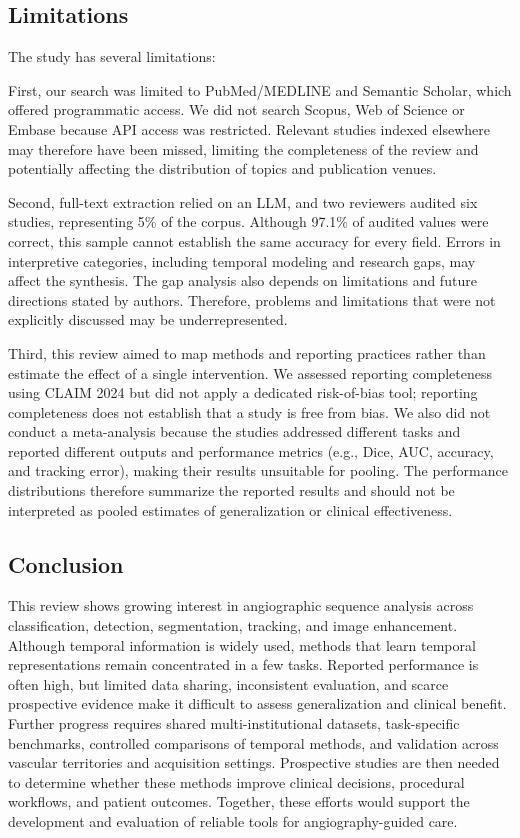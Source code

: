 \subsection{Limitations}
\label{sec:limitations}
The study has several limitations:

First, our search was limited to PubMed/\allowbreak MEDLINE and Semantic Scholar, which offered programmatic access. We did not search Scopus, Web of Science or Embase because API access was restricted. Relevant studies indexed elsewhere may therefore have been missed, limiting the completeness of the review and potentially affecting the distribution of topics and publication venues. 


Second, full-text extraction relied on an LLM, and two reviewers audited six studies, representing 5\% of the corpus. Although 97.1\% of audited values were correct, this sample cannot establish the same accuracy for every field. Errors in interpretive categories, including temporal modeling and research gaps, may affect the synthesis. The gap analysis also depends on limitations and future directions stated by authors. Therefore, problems and limitations that were not explicitly discussed may be underrepresented. 

Third, this review aimed to map methods and reporting practices rather than estimate the effect of a single intervention. We assessed reporting completeness using CLAIM 2024 but did not apply a dedicated risk-of-bias tool; reporting completeness does not establish that a study is free from bias. We also did not conduct a meta-analysis because the studies addressed different tasks and reported different outputs and performance metrics (e.g., Dice, AUC, accuracy, and tracking error), making their results unsuitable for pooling. The performance distributions therefore summarize the reported results and should not be interpreted as pooled estimates of generalization or clinical effectiveness.

\subsection{Conclusion}

This review shows growing interest in angiographic sequence analysis across classification, detection, segmentation, tracking, and image enhancement. Although temporal information is widely used, methods that learn temporal representations remain concentrated in a few tasks. Reported performance is often high, but limited data sharing, inconsistent evaluation, and scarce prospective evidence make it difficult to assess generalization and clinical benefit. Further progress requires shared multi-institutional datasets, task-specific benchmarks, controlled comparisons of temporal methods, and validation across vascular territories and acquisition settings. Prospective studies are then needed to determine whether these methods improve clinical decisions, procedural workflows, and patient outcomes. Together, these efforts would support the development and evaluation of reliable tools for angiography-guided care.
